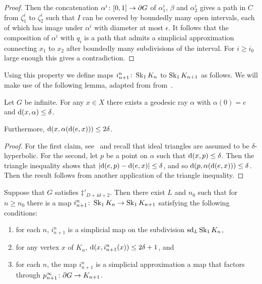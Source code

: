 \documentclass[a4paper]{article}
\begin{document}
\begin{proof}
  Then the concatenation $\alpha^i\colon[0,1]\to \partial G$ of $\alpha_1^i$,
  $\beta$ and $\alpha_2^i$ gives a path in $C$ from $\zeta_1^i$ to $\zeta_2^i$
  such that $I$ can be covered by boundedly many open intervals, each of which
  has image under $\alpha^i$ with diameter at most $\epsilon$. It follows that
  the composition of $\alpha^i$ with $q_i$ is a path that admits a simplicial
  approximation connecting $x_1$ to $x_2$ after boundedly many subdivisions of
  the interval. For $i \geq i_0$ large enough this gives a contradiction.
\end{proof}

Using this property we define maps $i^n_{n+1}\colon \operatorname{Sk}_1 K_n$ to
$\operatorname{Sk}_1K_{n+1}$ as follows.  We will make use of the following lemma, adapted
from from~\cite{bestvinamess91}.

\begin{lemma}\cite{bestvinamess91}\label{lem:near_geod_rays}
  Let $G$ be infinite. For any $x \in X$ there exists a geodesic ray $\alpha$ 
  with $\alpha(0) = e$ and $\operatorname{d}(x,\alpha) \leq \delta$. 
  
  Furthermore, $\operatorname{d}(x, \alpha(\operatorname{d}(e,x))) \leq 2\delta$.
\end{lemma}

\begin{proof}
  For the first claim, see~\cite{bestvinamess91} and recall that ideal
  triangles are assumed to be $\delta$-hyperbolic. For the second, let $p$ be
  a point on $\alpha$ such that $\operatorname{d}(x, p) \leq \delta$. Then the triangle
  inequality shows that $\left|\operatorname{d}(e,p) - \operatorname{d}(e,x)\right| \leq \delta$, and so
  $\operatorname{d}(p, \alpha(\operatorname{d}(e,x))) \leq \delta$. Then the result follows from
  another application of the triangle inequality.
\end{proof}

\begin{proposition}\label{prop:i_in_dimension_1}
  Suppose that $G$ satisfies $\ddag'_{D + 4\delta+2}$. Then there exist $L$ and
  $n_0$ such that for $n\geq n_0$ there is a map $i^n_{n+1}\colon \operatorname{Sk}_1 K_n
  \to \operatorname{Sk}_1 K_{n+1}$ satisfying the following conditions:
  \begin{enumerate}
    \item for each $n$, $i^n_{n+1}$ is a simplicial map on the subdivision
      $\operatorname{sd}_L\operatorname{Sk}_1 K_n$,
    \item for any vertex $x$ of $K_n$, $\operatorname{d}(x, i^n_{n+1}(x)) \leq 2\delta+1$,
      and
    \item for each $n$, the map $i^n_{n+1}$ is a simplicial approximation a map
      that factors through $p^\infty_{n+1}\colon \partial G \to K_{n+1}$.
  \end{enumerate}
\end{proposition}
\end{document}
